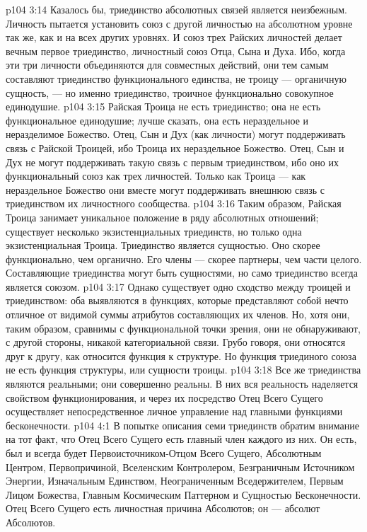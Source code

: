 \vs p104 3:14 \pc Казалось бы, триединство абсолютных связей является неизбежным. Личность пытается установить союз с другой личностью на абсолютном уровне так же, как и на всех других уровнях. И союз трех Райских личностей делает вечным первое триединство, личностный союз Отца, Сына и Духа. Ибо, когда эти три личности объединяются  для совместных действий, они тем самым составляют триединство функционального единства, не троицу --- органичную сущность, --- но именно триединство, троичное функционально совокупное единодушие.
\vs p104 3:15 Райская Троица не есть триединство; она не есть функциональное единодушие; лучше сказать, она есть нераздельное и неразделимое Божество. Отец, Сын и Дух (как личности) могут поддерживать связь с Райской Троицей, ибо Троица  их нераздельное Божество. Отец, Сын и Дух не могут поддерживать такую связь с первым триединством, ибо оно  их функциональный союз как трех личностей. Только как Троица --- как нераздельное Божество они вместе могут поддерживать внешнюю связь с триединством их личностного сообщества.
\vs p104 3:16 Таким образом, Райская Троица занимает уникальное положение в ряду абсолютных отношений; существует несколько экзистенциальных триединств, но только одна экзистенциальная Троица. Триединство  является сущностью. Оно скорее функционально, чем органично. Его члены --- скорее партнеры, чем части целого. Составляющие триединства могут быть сущностями, но само триединство всегда является союзом.
\vs p104 3:17 Однако существует одно сходство между троицей и триединством: оба выявляются в функциях, которые представляют собой нечто отличное от видимой суммы атрибутов составляющих их членов. Но, хотя они, таким образом, сравнимы с функциональной точки зрения, они не обнаруживают, с другой стороны, никакой категориальной связи. Грубо говоря, они относятся друг к другу, как относится функция к структуре. Но функция триединого союза не есть функция структуры, или сущности троицы.
\vs p104 3:18 Все же триединства являются реальными; они совершенно реальны. В них вся реальность наделяется свойством функционирования, и через их посредство Отец Всего Сущего осуществляет непосредственное личное управление над главными функциями бесконечности.
\vs p104 4:1 В попытке описания семи триединств обратим внимание на тот факт, что Отец Всего Сущего есть главный член каждого из них. Он есть, был и всегда будет Первоисточником\hyp{}Отцом Всего Сущего, Абсолютным Центром, Первопричиной, Вселенским Контролером, Безграничным Источником Энергии, Изначальным Единством, Неограниченным Вседержителем, Первым Лицом Божества, Главным Космическим Паттерном и Сущностью Бесконечности. Отец Всего Сущего есть личностная причина Абсолютов; он --- абсолют Абсолютов.
